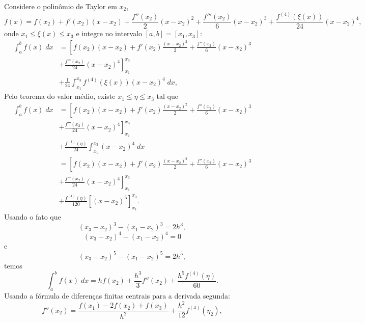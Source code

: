 Considere o polinômio de Taylor em $x_2$,
\begin{equation}
f(x)=f(x_2)+f'(x_2)(x-x_2)+\frac{f''(x_2)}{2}(x-x_2)^2+\frac{f'''(x_2)}{6}(x-x_2)^3+\frac{f^{(4)}(\xi(x))}{24}(x-x_2)^4,
\end{equation}
onde $x_1\leq\xi(x)\leq x_3$ e integre no intervalo $[a,b]=[x_1,x_3]$:
\begin{equation}
  \begin{split}
    \int_a^bf(x)\;dx&= \left[f(x_2)(x-x_2)+f'(x_2)\frac{(x-x_2)^2}{2} + \frac{f''(x_2)}{6}(x-x_2)^3\right. \\
      &\left. + \frac{f'''(x_2)}{24}(x-x_2)^4\right]_{x_1}^{x_3}\\
      &+ \frac{1}{24}\int_{x_1}^{x_3}f^{(4)}(\xi(x))(x-x_2)^4\;dx,
  \end{split}
\end{equation}
Pelo teorema do valor médio, existe $x_1\leq\eta\leq x_3$ tal que
\begin{equation}
  \begin{split}
    \int_a^bf(x)\;dx&= \left[f(x_2)(x-x_2)+f'(x_2)\frac{(x-x_2)^2}{2}+\frac{f''(x_2)}{6}(x-x_2)^3\right.\\
    &+\left.\frac{f'''(x_2)}{24}(x-x_2)^4\right]_{x_1}^{x_3}\\
    &+ \frac{f^{(4)}(\eta)}{24}\int_{x_1}^{x_3}(x-x_2)^4\;dx\\
    &= \left[f(x_2)(x-x_2)+f'(x_2)\frac{(x-x_2)^2}{2}+\frac{f''(x_2)}{6}(x-x_2)^3\right.\\
    &+\left.\frac{f'''(x_2)}{24}(x-x_2)^4\right]_{x_1}^{x_3}\\
    &+ \frac{f^{(4)}(\eta)}{120}\left[(x-x_2)^5\right]_{x_1}^{x_3}.
  \end{split}
\end{equation}
Usando o fato que
\begin{equation}
(x_3-x_2)^3-(x_1-x_2)^3=2h^3,
\end{equation}
\begin{equation}
(x_3-x_2)^4-(x_1-x_2)^4=0
\end{equation}
e
\begin{equation}
(x_3-x_2)^5-(x_1-x_2)^5=2h^5,
\end{equation}
temos
\begin{equation}
\int_a^bf(x)\;dx=hf(x_2)+\frac{h^3}{3}f''(x_2)+\frac{h^5f^{(4)}(\eta)}{60}.
\end{equation}
Usando a fórmula de diferenças finitas centrais para a derivada segunda:
\begin{equation}
f''(x_2)=\frac{f(x_1)-2f(x_2)+f(x_3)}{h^2}+\frac{h^2}{12}f^{(4)}(\eta_2),
\end{equation}
